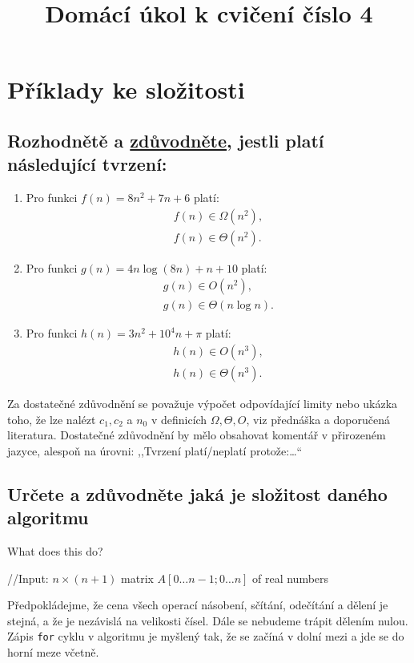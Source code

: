 \documentclass[12pt,oneside]{article}
\title{Domácí úkol k cvičení číslo 4}
\begin{document}
	\maketitle
	\section{Příklady ke složitosti}
	\subsection{Rozhodnětě a \underline{zdůvodněte}, jestli platí následující tvrzení:}
		\begin{enumerate}
		\item Pro funkci $f(n) = 8n^2 + 7n + 6$ platí:
		\begin{align}
			f(n) \in \Omega(n^2), \\
			f(n) \in \Theta(n^2).
		\end{align}
		\item Pro funkci $g(n) = 4n\log(8n) + n + 10$ platí:
		\begin{align}
			g(n) \in O(n^2), \\
			g(n) \in \Theta(n\log n).
		\end{align}
		\item Pro funkci $h(n) = 3n^2 + 10^4n+  \pi $ platí:
		\begin{align}
			h(n) \in O(n^3) ,\\
			h(n) \in \Theta(n^3).
		\end{align}
	\end{enumerate}
	Za dostatečné zdůvodnění se považuje výpočet odpovídající limity nebo ukázka toho, že lze nalézt $c_1, c_2$ a $n_0$ v definicích $\Omega, \Theta, O$, viz přednáška a doporučená literatura.
	Dostatečné zdůvodnění by mělo obsahovat komentář v přirozeném jazyce, alespoň na úrovni: ,,Tvrzení platí/neplatí protože:\dots``
	
	\subsection{Určete a zdůvodněte jaká je složitost daného algoritmu}
	\begin{algorithm}[ht]
		\caption{What does this do?}
		\DontPrintSemicolon
		//Input: $n\times (n+1)$ matrix $A[0\dots n-1; 0 \dots n]$ of real numbers \;
		\end{algorithm}
		Předpokládejme, že cena všech operací násobení, sčítání, odečítání a dělení je stejná, a že je nezávislá na velikosti čísel.
	Dále se nebudeme trápit dělením nulou.
	Zápis \verb|for| cyklu v algoritmu je myšlený tak, že se začíná v dolní mezi a jde se do horní meze včetně.
	
\end{document}
